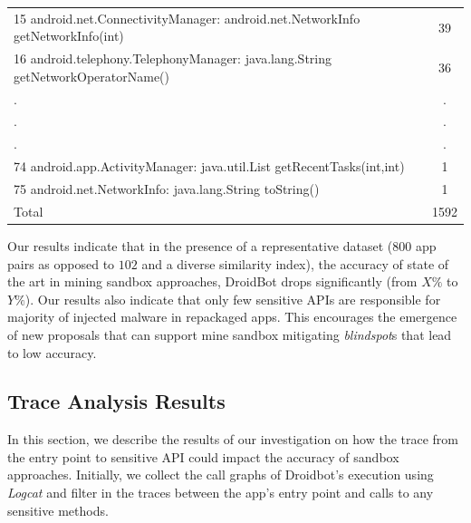 \begin{table}[t]
\begin{small}
\begin{tabular}{lc}
   15 android.net.ConnectivityManager: android.net.NetworkInfo getNetworkInfo(int) &  39 \\
   16 android.telephony.TelephonyManager: java.lang.String getNetworkOperatorName() &  36 \\
   .&  .\\
   .&  .\\
   .&  .\\
   74 android.app.ActivityManager: java.util.List getRecentTasks(int,int) & 1 \\
   75 android.net.NetworkInfo: java.lang.String toString() & 1 \\

 \bottomrule
                            Total & 1592 \\

 \end{tabular}
 \end{small}
 \label{tab:APIused}
\end{table}

\begin{obs}{1}{}
   Our results indicate that in the presence of a representative dataset ($800$ app pairs as opposed to $102$ and a diverse similarity index), the accuracy of state of the art in mining sandbox approaches, DroidBot drops significantly (from $X\%$ to $Y\%$). Our results also indicate that only few sensitive APIs are responsible for majority of injected malware in repackaged apps. This encourages the emergence of new proposals that can support mine sandbox mitigating \textit{blindspot}s that lead to low accuracy.
 \end{obs}



\subsection{Trace Analysis Results}\label{sec:traceResults}

In this section, we describe the results of our investigation on how the trace from the entry point to sensitive API could impact the accuracy of sandbox approaches. Initially, we collect the call graphs of Droidbot's execution using \emph{Logcat} and filter in the traces between the app's entry point and calls to any sensitive methods.

